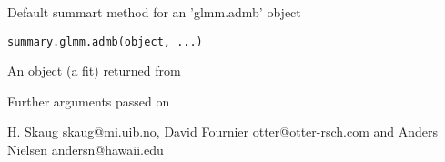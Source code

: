 \begin{Description}\relax
Default summart method for an 'glmm.admb' object
\end{Description}
\begin{Usage}
\begin{verbatim}
summary.glmm.admb(object, ...)
\end{verbatim}
\end{Usage}
\begin{Arguments}
\begin{ldescription}
\item[\code{object}] An object (a fit) returned from 
\item[\code{...}] Further arguments passed on
\end{ldescription}
\end{Arguments}
\begin{Author}\relax
H. Skaug skaug@mi.uib.no, David Fournier otter@otter-rsch.com and 
Anders Nielsen andersn@hawaii.edu
\end{Author}
\begin{SeeAlso}\relax
{}
\end{SeeAlso}

